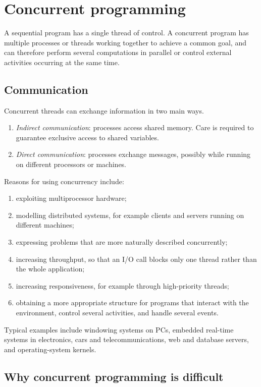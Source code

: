 \documentclass[a4paper]{article}
\begin{document}
\section{Concurrent programming}

A sequential program has a single thread of control.
A concurrent program has multiple processes or threads working together to achieve a common goal, and can therefore perform several computations in parallel or control external activities occurring at the same time.

\subsection{Communication}

Concurrent threads can exchange information in two main ways.
\begin{enumerate}
    \item \emph{Indirect communication}: processes access shared memory. Care is required to guarantee exclusive access to shared variables.
    \item \emph{Direct communication}: processes exchange messages, possibly while running on different processors or machines.
\end{enumerate}

Reasons for using concurrency include:
\begin{enumerate}
    \item exploiting multiprocessor hardware;
    \item modelling distributed systems, for example clients and servers running on different machines;
    \item expressing problems that are more naturally described concurrently;
    \item increasing throughput, so that an I/O call blocks only one thread rather than the whole application;
    \item increasing responsiveness, for example through high-priority threads;
    \item obtaining a more appropriate structure for programs that interact with the environment, control several activities, and handle several events.
\end{enumerate}

Typical examples include windowing systems on PCs, embedded real-time systems in electronics, cars and telecommunications, web and database servers, and operating-system kernels.

\subsection{Why concurrent programming is difficult}
\end{document}
